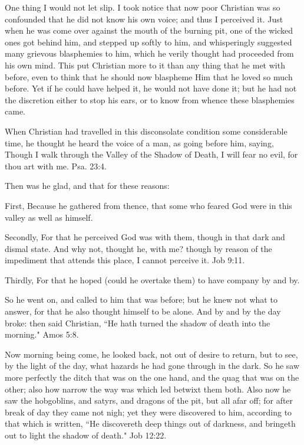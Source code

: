 One thing I would not let slip. I took notice that now poor Christian was so confounded that he did not know his own voice; and thus I perceived it. Just when he was come over against the mouth of the burning pit, one of the wicked ones got behind him, and stepped up softly to him, and whisperingly suggested many grievous blasphemies to him, which he verily thought had proceeded from his own mind. This put Christian more to it than any thing that he met with before, even to think that he should now blaspheme Him that he loved so much before. Yet if he could have helped it, he would not have done it; but he had not the discretion either to stop his ears, or to know from whence these blasphemies came.

When Christian had travelled in this disconsolate condition some considerable time, he thought he heard the voice of a man, as going before him, saying, Though I walk through the Valley of the Shadow of Death, I will fear no evil, for thou art with me. Psa. 23:4.

Then was he glad, and that for these reasons:

First, Because he gathered from thence, that some who feared God were in this valley as well as himself.

Secondly, For that he perceived God was with them, though in that dark and dismal state. And why not, thought he, with me? though by reason of the impediment that attends this place, I cannot perceive it. Job 9:11.

Thirdly, For that he hoped (could he overtake them) to have company by and by.

So he went on, and called to him that was before; but he knew not what to answer, for that he also thought himself to be alone. And by and by the day broke: then said Christian, ``He hath turned the shadow of death into the morning." Amos 5:8.

Now morning being come, he looked back, not out of desire to return, but to see, by the light of the day, what hazards he had gone through in the dark. So he saw more perfectly the ditch that was on the one hand, and the quag that was on the other; also how narrow the way was which led betwixt them both. Also now he saw the hobgoblins, and satyrs, and dragons of the pit, but all afar off; for after break of day they came not nigh; yet they were discovered to him, according to that which is written, ``He discovereth deep things out of darkness, and bringeth out to light the shadow of death." Job 12:22.


